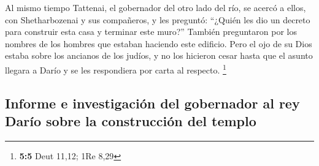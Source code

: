 \begin{paracol}{2}
 Al mismo tiempo Tattenai, el gobernador del otro lado del
río, se acercó a ellos, con Shetharbozenai y sus compañeros, y les
preguntó: ``¿Quién les dio un decreto para construir esta casa y
terminar este muro?''  También preguntaron por los nombres
de los hombres que estaban haciendo este edificio.  Pero
el ojo de su Dios estaba sobre los ancianos de los judíos, y no los
hicieron cesar hasta que el asunto llegara a Darío y se les respondiera
por carta al respecto. \footnote{\textbf{5:5} Deut 11,12; 1Re 8,29}

\hypertarget{informe-e-investigaciuxf3n-del-gobernador-al-rey-daruxedo-sobre-la-construcciuxf3n-del-templo}{%
\subsection{Informe e investigación del gobernador al rey Darío sobre la
construcción del
templo}\label{informe-e-investigaciuxf3n-del-gobernador-al-rey-daruxedo-sobre-la-construcciuxf3n-del-templo}}


\end{paracol}
